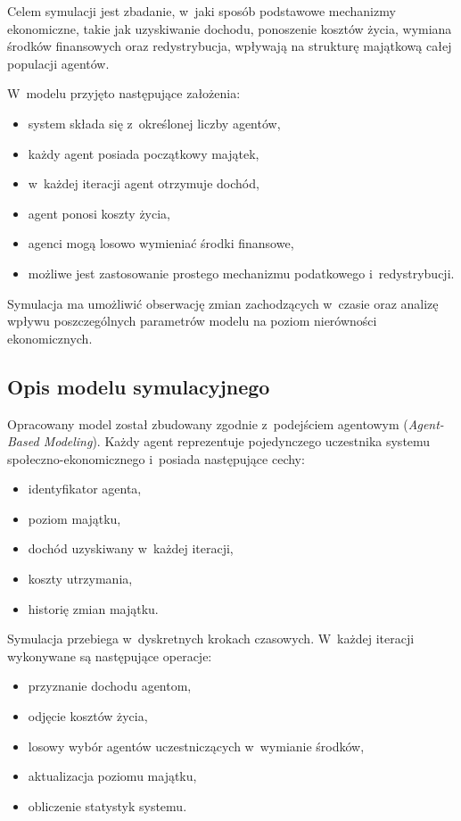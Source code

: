 \documentclass[polish]{projectreport}
\begin{document}
Celem symulacji jest zbadanie, w~jaki spos\'ob podstawowe mechanizmy ekonomiczne,
takie jak uzyskiwanie dochodu, ponoszenie koszt\'ow \.{z}ycia, wymiana \'srodk\'ow finansowych
oraz redystrybucja, wp\l{}ywaj\k{a} na struktur\k{e} maj\k{a}tkow\k{a} ca\l{}ej populacji agent\'ow.

W~modelu przyj\k{e}to nast\k{e}puj\k{a}ce za\l{}o\.{z}enia:
\begin{itemize}
  \item system sk\l{}ada si\k{e} z~okre\'slonej liczby agent\'ow,
  \item ka\.{z}dy agent posiada pocz\k{a}tkowy maj\k{a}tek,
  \item w~ka\.{z}dej iteracji agent otrzymuje doch\'od,
  \item agent ponosi koszty \.{z}ycia,
  \item agenci mog\k{a} losowo wymienia\'{c} \'srodki finansowe,
  \item mo\.{z}liwe jest zastosowanie prostego mechanizmu podatkowego i~redystrybucji.
\end{itemize}

Symulacja ma umo\.{z}liwi\'{c} obserwacj\k{e} zmian zachodz\k{a}cych w~czasie oraz analiz\k{e} wp\l{}ywu
poszczeg\'olnych parametr\'ow modelu na poziom nier\'owno\'sci ekonomicznych.

\subsection{Opis modelu symulacyjnego}
\label{sec:model}

Opracowany model zosta\l{} zbudowany zgodnie z~podej\'sciem agentowym
(\emph{Agent-Based Modeling}). Ka\.{z}dy agent reprezentuje pojedynczego uczestnika
systemu spo\l{}eczno-ekonomicznego i~posiada nast\k{e}puj\k{a}ce cechy:
\begin{itemize}
  \item identyfikator agenta,
  \item poziom maj\k{a}tku,
  \item doch\'od uzyskiwany w~ka\.{z}dej iteracji,
  \item koszty utrzymania,
  \item histori\k{e} zmian maj\k{a}tku.
\end{itemize}

Symulacja przebiega w~dyskretnych krokach czasowych. W~ka\.{z}dej iteracji wykonywane
s\k{a} nast\k{e}puj\k{a}ce operacje:
\begin{itemize}
  \item przyznanie dochodu agentom,
  \item odj\k{e}cie koszt\'ow \.{z}ycia,
  \item losowy wyb\'or agent\'ow uczestnicz\k{a}cych w~wymianie \'srodk\'ow,
  \item aktualizacja poziomu maj\k{a}tku,
  \item obliczenie statystyk systemu.
\end{itemize}
\end{document}
